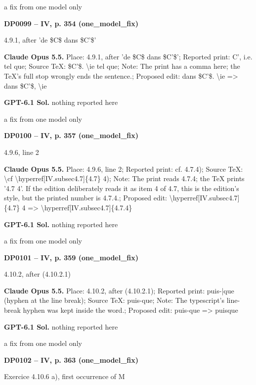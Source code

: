 a fix from one model only\par
\par\noindent\hypertarget{DP0099}{}\textbf{DP0099 -- IV, p. 354 (one\_model\_fix)}\par
4.9.1, after 'de \$C\$ dans \$C'\$'\par
\textbf{Claude Opus 5.5.} Place: 4.9.1, after 'de \$C\$ dans \$C'\$'; Reported print: C', i.e. tel que; Source TeX: \$C'\$. \textbackslash{}ie tel que; Note: The print has a comma here; the TeX's full stop wrongly ends the sentence.; Proposed edit: dans \$C'\$. \textbackslash{}ie =\allowbreak > dans \$C'\$, \textbackslash{}ie\par
\textbf{GPT-6.1 Sol.} nothing reported here\par
a fix from one model only\par
\par\noindent\hypertarget{DP0100}{}\textbf{DP0100 -- IV, p. 357 (one\_model\_fix)}\par
4.9.6, line 2\par
\textbf{Claude Opus 5.5.} Place: 4.9.6, line 2; Reported print: cf. 4.7.4); Source TeX: \textbackslash{}cf \textbackslash{}hyperref[IV.subsec4.7]\{4.7\} 4); Note: The print reads 4.7.4; the TeX prints '4.7 4'. If the edition deliberately reads it as item 4 of 4.7, this is the edition's style, but the printed number is 4.7.4.; Proposed edit: \textbackslash{}hyperref[IV.subsec4.7]\{4.7\} 4 =\allowbreak > \textbackslash{}hyperref[IV.subsec4.7]\{4.7.4\}\par
\textbf{GPT-6.1 Sol.} nothing reported here\par
a fix from one model only\par
\par\noindent\hypertarget{DP0101}{}\textbf{DP0101 -- IV, p. 359 (one\_model\_fix)}\par
4.10.2, after (4.10.2.1)\par
\textbf{Claude Opus 5.5.} Place: 4.10.2, after (4.10.2.1); Reported print: puis-|que (hyphen at the line break); Source TeX: puis-que; Note: The typescript's line-break hyphen was kept inside the word.; Proposed edit: puis-que =\allowbreak > puisque\par
\textbf{GPT-6.1 Sol.} nothing reported here\par
a fix from one model only\par
\par\noindent\hypertarget{DP0102}{}\textbf{DP0102 -- IV, p. 363 (one\_model\_fix)}\par
Exercice 4.10.6 a), first occurrence of M\par
